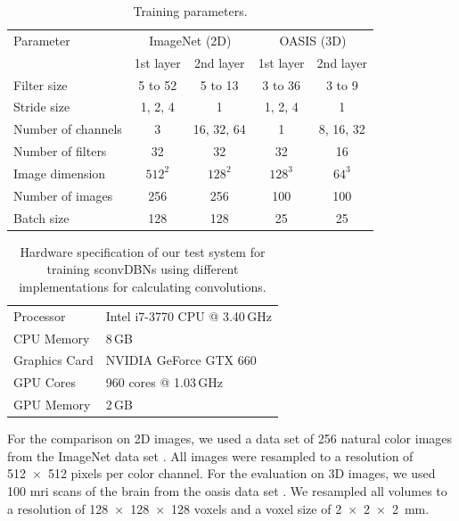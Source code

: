 \begin{table}
\centering
\caption{Training parameters.}
\begin{tabular}{lcccc}
\toprule
Parameter & \multicolumn{2}{c}{ImageNet (2D)} & \multicolumn{2}{c}{OASIS (3D)}
\\
\addlinespace
 & \multicolumn{1}{c}{1st layer} & \multicolumn{1}{c}{2nd layer} 
 & \multicolumn{1}{c}{1st layer} & \multicolumn{1}{c}{2nd layer} \\
\midrule
Filter size & 5 to 52 & 5 to 13 & 3 to 36 & 3 to 9 \\
Stride size & 1, 2, 4 & 1 & 1, 2, 4 & 1 \\
Number of channels & 3 & 16, 32, 64 & 1 & 8, 16, 32 \\
Number of filters & 32 & 32 & 32 & 16 \\
Image dimension & $512^2$ & $128^2$ & $128^3$ & $64^3$ \\
Number of images & 256 & 256 & 100 & 100 \\
Batch size & 128 & 128 & 25 & 25 \\
\bottomrule
\end{tabular}
\label{tab:parameters}
\end{table}

\begin{table} 
\centering
\caption{Hardware specification of our test system for training sconvDBNs using
different implementations for calculating convolutions.}
\label{tab:hardware1}
\begin{tabular} {ll}
\toprule
Processor & Intel i7-3770 CPU @ 3.40\,GHz \\
CPU Memory & 8\,GB \\
\addlinespace
Graphics Card & NVIDIA GeForce GTX 660 \\
GPU Cores & 960 cores @ 1.03\,GHz \\
GPU Memory & 2\,GB \\
\bottomrule
\end{tabular}
\end{table}

For the comparison on 2D images, we used a data set of 256 natural color images
from the ImageNet data set \citep{deng2009}. All images were resampled to a
resolution of \num{512x512} pixels per color channel. For the evaluation on 3D
images, we used 100 \gls{mri} scans of the brain from the \gls{oasis}
data set \citep{marcus2007}. We resampled all volumes to a resolution of
\num{128x128x128} voxels and a voxel size of \SI{2x2x2}{\milli\metre}.

